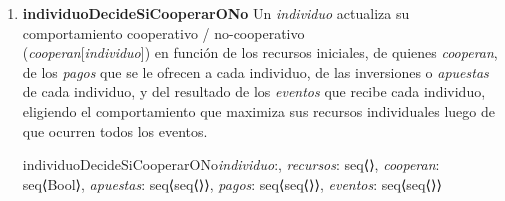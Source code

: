 \documentclass[10pt,a4paper]{article}
\begin{document}
\begin{enumerate}
\begin{proc}{trayectoriaExtrañaEscalera}{\In \textit{trayectoria}: seq⟨\real⟩} {Bool}
    \end{proc}

    \item \textbf{individuoDecideSiCooperarONo} Un \textit{individuo} actualiza su comportamiento cooperativo / no-cooperativo \\(\textit{cooperan}[\textit{individuo}]) en función de los recursos iniciales, de quienes \textit{cooperan}, de los \textit{pagos} que se le ofrecen a cada individuo, de las inversiones o \textit{apuestas} de cada individuo, y del resultado de los \textit{eventos} que recibe cada individuo, eligiendo el comportamiento que maximiza sus recursos individuales luego de que ocurren todos los eventos.

    \begin{proc}{individuoDecideSiCooperarONo}{\In \textit{individuo}:\nat, \In \textit{recursos}: seq⟨\real⟩, \Inout \textit{cooperan}: seq⟨Bool⟩, \In \textit{apuestas}: seq⟨seq⟨\real⟩⟩,
        \In \textit{pagos}: seq⟨seq⟨\real⟩⟩, \In \textit{eventos}: seq⟨seq⟨\nat⟩⟩} {}
\end{proc}
\end{enumerate}
\end{document}
